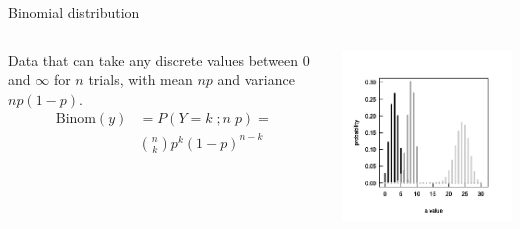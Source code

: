 \documentclass{beamer}
\begin{document}
\begin{frame}{Binomial distribution}
    \begin{columns}
        \begin{column}{0.5\textwidth}
        Data that can take any discrete values between $0$ and $\infty$ for $n$ trials, with mean $np$ and variance $np(1 - p)$.  
        \begin{align*}
        \text{Binom}(y) &= P(Y = k\; ; n \;p) = \\
        &\binom{n}{k} p^k(1-p)^{n-k}
        \end{align*}
        \end{column}
        \begin{column}{0.5\textwidth}
         \includegraphics[width=\textwidth]{lectures/day_10_GLMMs/figures/unnamed-chunk-3-1.png} %
        \end{column}
    \end{columns}
\end{frame}
\end{document}
